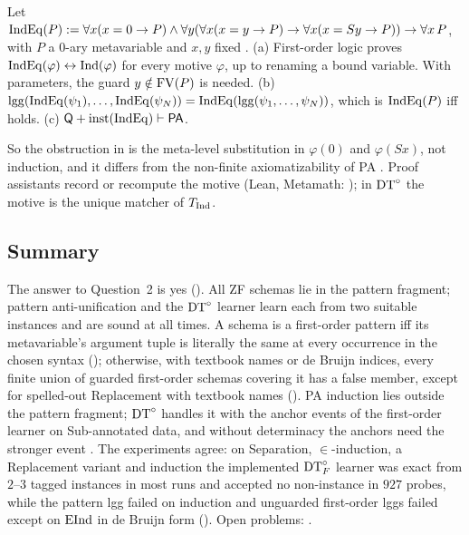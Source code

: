 \begin{proposition}\label{prop:zf:indeq}
Let $\mathrm{IndEq}(P):=\forall x(x=0\to P)\wedge\forall y(\forall x(x=y\to P)\to\forall x(x=Sy\to P))\to\forall x\,P$, with
$P$ a 0-ary metavariable and $x,y$ fixed \citep{tarski1965simplified}.
(a) First-order logic proves $\mathrm{IndEq}(\varphi)\leftrightarrow\mathrm{Ind}(\varphi)$ for every motive $\varphi$, up to renaming a
bound variable. With parameters, the guard $y\notin\mathrm{FV}(P)$ is needed.
(b) $\mathrm{lgg}(\mathrm{IndEq}(\psi_1),\dots,\mathrm{IndEq}(\psi_N))=\mathrm{IndEq}(\mathrm{lgg}(\psi_1,\dots,\psi_N))$, which is $\mathrm{IndEq}(P)$ iff \evR{} holds.
(c) $\mathsf{Q}+\mathrm{inst}(\mathrm{IndEq})\vdash\mathsf{PA}$.
\end{proposition}
So the obstruction in  is the meta-level substitution in $\varphi(0)$ and $\varphi(Sx)$, not
induction, and it differs from the non-finite axiomatizability of PA \citep{rylln1952axiomatizability}. Proof
assistants record or recompute the motive (Lean, Metamath: ); in $\mathrm{DT}^{\circ}$ the motive is the unique
matcher of $T_{\mathrm{Ind}}$.

\subsection{Summary}\label{sec:zf:summary}

The answer to Question~2 is yes (). All ZF schemas lie in the pattern fragment; pattern
anti-unification and the $\mathrm{DT}^{\circ}$ learner learn each from two suitable instances and are sound at all times. A schema is a
first-order pattern iff its metavariable's argument tuple is literally the same at every occurrence in the chosen
syntax (); otherwise, with textbook names or de Bruijn indices, every finite union
of guarded first-order schemas covering it has a false member, except for spelled-out Replacement with textbook names
(). PA induction lies
outside the pattern fragment; $\mathrm{DT}^{\circ}$ handles it with the anchor events of the first-order learner on Sub-annotated data,
and without determinacy the anchors need the stronger event \zfB. The experiments agree: on Separation,
$\in$-induction, a Replacement variant and induction the implemented $\mathrm{DT}^{\circ}_{F}$ learner was exact from $2$--$3$ tagged
instances in most runs and accepted no non-instance in $927$ probes, while the pattern lgg failed on induction and
unguarded first-order lggs failed except on $\mathrm{EInd}$ in de Bruijn form (). Open
problems: .

